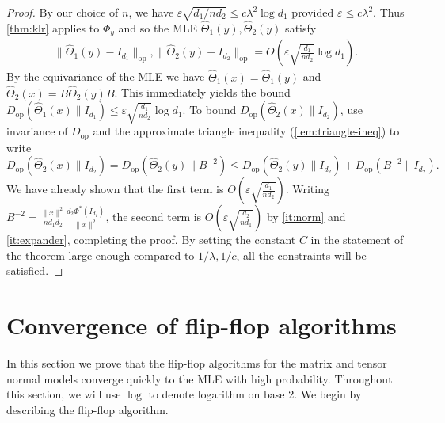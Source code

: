 \documentclass[aos]{imsart}
\theoremstyle{definition}
\numberwithin{equation}{section}
\DeclareMathOperator{\op}{op}
\newcommand{\htheta}{\widehat{\Theta}}
\newcommand{\eps}{\varepsilon}
\newcommand{\Dop}{D_{\operatorname{op}}}
\begin{document}
\begin{proof}
By our choice of $n$, we have $\eps \sqrt{d_1/nd_2} \leq c\lambda^2\log d_1$ provided $\eps \leq c\lambda^2$.
Thus \cref{thm:klr} applies to $\Phi_y$ and so the MLE $\htheta_1(y), \htheta_2(y)$ satisfy
\begin{gather*} \| \htheta_1(y) - I_{d_1}\|_{\op}, \| \htheta_2(y) - I_{d_2}\|_{\op} = O\left(\eps \sqrt{\frac{d_1}{n d_2}} \log d_1\right).\end{gather*}
By the equivariance of the MLE we have $\htheta_1(x) = \htheta_1(y)$ and $\htheta_2(x) = B \htheta_2 (y) B$. This immediately yields the bound $ \Dop(\htheta_1(x) \rVert I_{d_1}) \leq \eps \sqrt{\frac{d_1}{n d_2}} \log d_1.$
To bound $\Dop(\htheta_2(x) \rVert I_{d_2})$, use invariance of $\Dop$ and the approximate triangle inequality (\cref{lem:triangle-ineq}) to write
$$\Dop(\htheta_2(x) \rVert I_{d_2}) = \Dop(\htheta_2(y) \rVert B^{-2}) \leq \Dop(\htheta_2(y)\rVert I_{d_2}) + \Dop(B^{-2}\rVert I_{d_2}).$$
We have already shown that the first term is $O(\eps \sqrt{\frac{d_1}{n d_2}}).$ Writing $B^{-2} = \frac{\|x\|^2}{nd_1 d_2} \frac{d_2 \Phi^*(I_{d_1})}{\|x\|^2}$, the second term is $O(\eps \sqrt{\frac{d_2}{n d_1}})$ by \cref{it:norm} and \cref{it:expander}, completing the proof.  By setting the constant $C$ in the statement of the theorem large enough compared to $1/\lambda, 1/c$, all the constraints will be satisfied.
\end{proof}

\section{Convergence of flip-flop algorithms}\label{sec:flipflop}

In this section we prove that the flip-flop algorithms for the matrix and tensor normal models converge quickly to the MLE with high probability.
Throughout this section, we will use $\log$ to denote logarithm on base 2.
We begin by describing the flip-flop algorithm.
\end{document}

